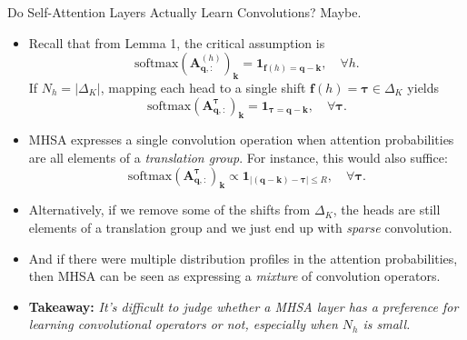 \documentclass[9pt]{beamer}
\newcommand{\abs}[1]{\left\vert#1\right\vert}
\newcommand{\mb}{\bm}
\begin{document}
\begin{frame}{Do Self-Attention Layers Actually Learn Convolutions? Maybe.}
\begin{itemize}
\item Recall that from Lemma 1, the critical assumption is
\begin{equation*}
    \mathrm{softmax}(\mb A^{(h)}_{\mb q,:})_{\mb k} 
        = \bm 1_{\bm f(h) = \bm q - \bm k}, 
        \quad \forall h.
\end{equation*}
If $N_h=\abs{\Delta_K}$, mapping each head to a single shift $\bm f(h)=\bm\tau\in\Delta_K$ yields 
\begin{equation*}
    \mathrm{softmax}(\mb A^{\bm\tau}_{\mb q,:})_{\mb k} 
        = \bm 1_{\bm \tau = \bm q - \bm k}, 
        \quad \forall \bm\tau.
\end{equation*}

\item MHSA expresses a single convolution operation when attention probabilities are all elements of a {\em translation group}. For instance, this would also suffice:
\begin{equation*}
    \mathrm{softmax}(\mb A^{\bm\tau}_{\mb q,:})_{\mb k} 
        \propto \bm 1_{\abs{(\bm q - \bm k)-\bm \tau}\leq R},
        \quad \forall \bm\tau.
\end{equation*}

\item Alternatively, if we remove some of the shifts from $\Delta_K$, the heads are still elements of a translation group and we just end up with {\em sparse} convolution.

\item And if there were multiple distribution profiles in the attention probabilities, then MHSA can be seen as expressing a {\em mixture} of convolution operators.

\item \textbf{Takeaway:} \emph{It's difficult to judge whether a MHSA layer has a preference for learning convolutional operators or not, especially when $N_h$ is small.}
\end{itemize}
\end{frame}
\end{document}
